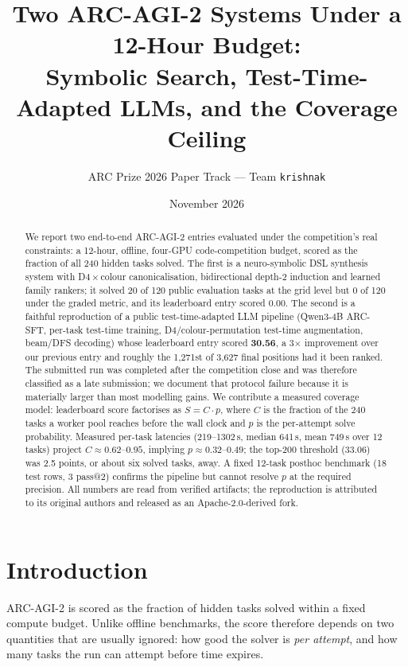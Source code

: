 \documentclass[11pt,a4paper]{article}
\title{\textbf{Two ARC-AGI-2 Systems Under a 12-Hour Budget:\\Symbolic Search, Test-Time-Adapted LLMs, and the Coverage Ceiling}}
\author{ARC Prize 2026 Paper Track --- Team \texttt{krishnak}}
\date{November 2026}
\begin{document}
\maketitle

\begin{abstract}
We report two end-to-end ARC-AGI-2 entries evaluated under the competition's real constraints: a 12-hour, offline, four-GPU code-competition budget, scored as the fraction of all 240 hidden tasks solved. The first is a neuro-symbolic DSL synthesis system with D4\,$\times$\,colour canonicalisation, bidirectional depth-2 induction and learned family rankers; it solved 20 of 120 public evaluation tasks at the grid level but 0 of 120 under the graded metric, and its leaderboard entry scored 0.00. The second is a faithful reproduction of a public test-time-adapted LLM pipeline (Qwen3-4B ARC-SFT, per-task test-time training, D4/colour-permutation test-time augmentation, beam/DFS decoding) whose leaderboard entry scored \textbf{30.56}, a 3$\times$ improvement over our previous entry and roughly the 1{,}271st of 3{,}627 final positions had it been ranked. The submitted run was completed after the competition close and was therefore classified as a late submission; we document that protocol failure because it is materially larger than most modelling gains. We contribute a measured coverage model: leaderboard score factorises as $S = C \cdot p$, where $C$ is the fraction of the 240 tasks a worker pool reaches before the wall clock and $p$ is the per-attempt solve probability. Measured per-task latencies (219--1302\,s, median 641\,s, mean 749\,s over 12 tasks) project $C \approx 0.62$--$0.95$, implying $p \approx 0.32$--$0.49$; the top-200 threshold (33.06) was 2.5 points, or about six solved tasks, away. A fixed 12-task posthoc benchmark (18 test rows, 3 pass@2) confirms the pipeline but cannot resolve $p$ at the required precision. All numbers are read from verified artifacts; the reproduction is attributed to its original authors and released as an Apache-2.0-derived fork.
\end{abstract}

\section{Introduction}

ARC-AGI-2 \cite{arcagi2} is scored as the fraction of hidden tasks solved within a fixed compute budget. Unlike offline benchmarks, the score therefore depends on two quantities that are usually ignored: how good the solver is \emph{per attempt}, and how many tasks the run can attempt before time expires.
\end{document}
